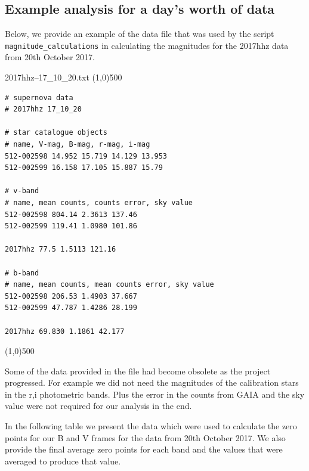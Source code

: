 \documentclass[twocolumn]{revtex4}
\begin{document}
{\subsection{Example analysis for a day's worth of data}
\vspace{-2ex}

Below, we provide an example of the data file that was used by the script \texttt{magnitude\_calculations} in calculating the magnitudes for the 2017hhz data from 20th October 2017.

\begin{center}
2017hhz--17\_10\_20.txt
\line(1,0){500}
\vspace{-4ex}
\end{center}
\begin{lstlisting}
# supernova data
# 2017hhz 17_10_20

# star catalogue objects
# name, V-mag, B-mag, r-mag, i-mag
512-002598 14.952 15.719 14.129 13.953
512-002599 16.158 17.105 15.887 15.79

# v-band
# name, mean counts, counts error, sky value
512-002598 804.14 2.3613 137.46
512-002599 119.41 1.0980 101.86

2017hhz 77.5 1.5113 121.16

# b-band
# name, mean counts, mean counts error, sky value
512-002598 206.53 1.4903 37.667
512-002599 47.787 1.4286 28.199

2017hhz 69.830 1.1861 42.177
\end{lstlisting}
\begin{center}
\vspace{-7ex}
\line(1,0){500}
\end{center}

Some of the data provided in the file had become obsolete as the project progressed. For example we did not need the magnitudes of the calibration stars in the r,i photometric bands. Plus the error in the counts from GAIA and the sky value were not required for our analysis in the end. 

\clearpage

In the following table we present the data which were used to calculate the zero points for our B and V frames for the data from 20th October 2017. We also provide the final average zero points for each band and the values that were averaged to produce that value.

}
\end{document}
